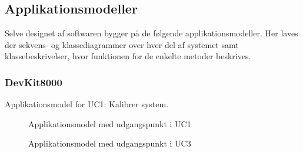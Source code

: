 \subsection{Applikationsmodeller}

Selve designet af softwaren bygger på de følgende applikationsmodeller. Her laves der sekvens- og klassediagrammer over hver del af systemet samt klassebeskrivelser, hvor funktionen for de enkelte metoder beskrives.

\subsubsection{DevKit8000}

Applikationsmodel for UC1: Kalibrer system.

\begin{figure}[H] \centering
    \caption{Applikationsmodel med udgangspunkt i UC1}
    \label{fig:uc1App}
\end{figure}

\begin{figure}[H] \centering
    \caption{Applikationsmodel med udgangspunkt i UC3}
    \label{fig:uc3App}
\end{figure}


